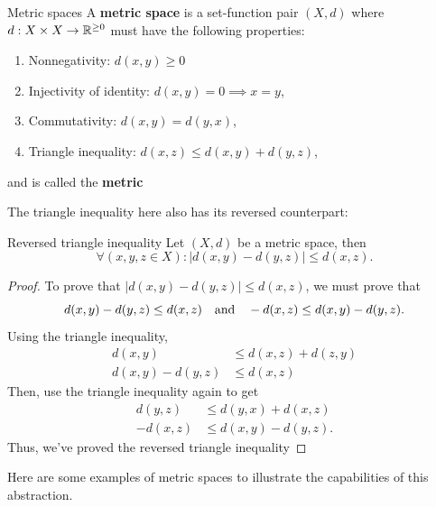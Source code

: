 \begin{df}{Metric spaces}{}
  A \textbf{metric space} is a set-function pair \((X, d)\) where
  \(d: X \times X \rightarrow \mathbb{R}^{\geq 0}\) must have the following properties:
  \begin{enumerate}[noitemsep]
    \item Nonnegativity: \(d(x, y) \geq 0\)
    \item Injectivity of identity: \(d(x, y) = 0 \implies x = y\),
    \item Commutativity: \(d(x, y) = d(y, x)\),
    \item Triangle inequality: \(d(x, z) \leq d(x, y) + d(y, z)\),
  \end{enumerate}
  and is called the \textbf{metric} 
   
\end{df}

The triangle inequality here also has its reversed counterpart:
\begin{prop}{Reversed triangle inequality}{}
  Let \((X, d)\) be a metric space, then
  \begin{equation}
    \forall (x, y, z \in X) : |d(x, y) - d(y, z)| \leq d(x, z).
  \end{equation}
\end{prop}

\begin{proof}
  To prove that \(|d(x, y) - d(y, z)| \leq d(x, z)\), we must prove that
  \begin{equation}
    d(x, y) - d(y, z) \leq d(x, z) \quad\textrm{and}\quad - d(x, z) \leq d(x, y) - d(y, z).
  \end{equation}
  Using the triangle inequality,
  \begin{align}
    d(x, y)           & \leq d(x, z) + d(z, y) \\
    d(x, y) - d(y, z) & \leq d(x, z)
  \end{align}
  Then, use the triangle inequality again to get
  \begin{align}
    d(y, z)   & \leq d(y, x) + d(x, z)  \\
    - d(x, z) & \leq d(x, y) - d(y, z).
  \end{align}
  Thus, we've proved the reversed triangle inequality
\end{proof}

Here are some examples of metric spaces to illustrate the capabilities of this abstraction.

